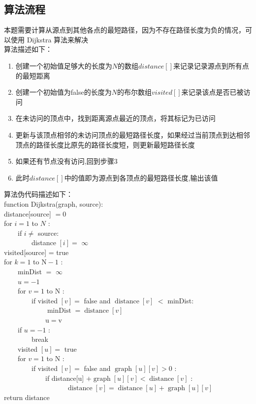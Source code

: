 \documentclass[UTF8,a4paperdui, %
]{ctexart}
\begin{document}
\subsection{算法流程}
本题需要计算从源点到其他各点的最短路径，因为不存在路径长度为负的情况，可以使用 Dijkstra 算法来解决\\
算法描述如下：
\begin{enumerate}
    \item 创建一个初始值足够大的长度为$N$的数组$distance[]$来记录记录源点到所有点的最短距离
    \item 创建一个初始值为false的长度为$N$的布尔数组$visited[]$来记录该点是否已被访问
    \item 在未访问的顶点中，找到距离源点最近的顶点，将其标记为已访问
    \item 更新与该顶点相邻的未访问顶点的最短路径长度，如果经过当前顶点到达相邻顶点的路径长度比原先的路径长度短，则更新最短路径长度
    \item 如果还有节点没有访问,回到步骤3
    \item 此时$distance[]$中的值即为源点到各顶点的最短路径长度,输出该值
\end{enumerate}
算法伪代码描述如下：\\
function Dijkstra(graph, source):\\
distance[source] $=0$\\
for $i=1$ to $N$ :\\
　　if $i \neq$ source:\\
　　　　distance $[i]=$ $\infty$\\
visited[source] = true\\
for $k=1$ to $\mathrm{N}-1$ :\\
　　minDist $=$ $\infty$\\
　　$u=-1$\\
　　for $v=1$ to $\mathrm{N}$ :\\
　　　　if visited $[v]=$ false and $\operatorname{distance}[v]$ $<$ minDist:\\
　　　　　　$\operatorname{minDist}=\operatorname{distance}[v]$\\
　　　　　　$\mathrm{u}=\mathrm{v}$\\
　　if $u=-1$ :\\
　　　　break\\
　　visited $[u]=$ true\\
　　for $v=1$ to $\mathrm{N}$ :\\
　　　　if visited $[v]=$ false and $\operatorname{graph}[u][v]>0$ :\\
　　　　　　if distance[u] $+\operatorname{graph}[u][v]<\operatorname{distance}[v]$ :\\
　　　　　　　　　$\operatorname{distance}[v]=\operatorname{distance}[u]+\operatorname{graph}[u][v]$\\
return distance
\end{document}
